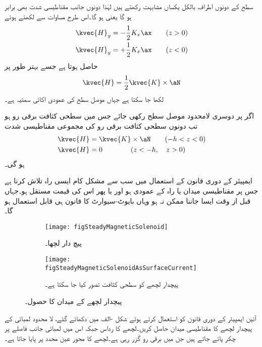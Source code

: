 سطح کے دونوں اطراف بالکل یکساں مشابہت رکھتے ہیں لہٰذا دونوں جانب  مقناطیسی شدت بھی برابر ہو گا یعنی  ہو گا۔اس طرح مساوات  سے  لکھتے ہوئے
\begin{align*}
\kvec{H}_{y}&=-\frac{1}{2}K_x \ax \quad \quad (z>0)\\
\kvec{H}_{y}&=+\frac{1}{2}K_x \ax \quad \quad (z<0)
\end{align*}
حاصل ہوتا ہے جسے  بہتر طور پر 
\begin{align}
\kvec{H}=\frac{1}{2} \kvec{K} \times \aN
\end{align}
لکھا جا سکتا ہے جہاں  موصل سطح کی عمودی اکائی سمتیہ ہے۔

اگر  پر دوسری لامحدود موصل سطح رکھی جائے جس میں سطحی کثافت برقی رو  ہو تب دونوں سطحی کثافت برقی رو کی مجموعی مقناطیسی شدت
\begin{gather}
\begin{aligned}
\kvec{H}&=\kvec{K} \times \aN \quad \quad (-h <z < 0)\\
\kvec{H}&=0 \quad \quad \quad \quad  (z<-h, \quad z>0) 
\end{aligned}
\end{gather}
ہو گی۔

ایمپیئر کے دوری قانون کے استعمال میں سب سے مشکل کام ایسی راہ تلاش کرنا ہے جس پر مقناطیسی میدان یا راہ کے عمودی ہو اور یا پھر اس کی قیمت مستقل ہو۔جہاں قبل از وقت ایسا جاننا ممکن نہ ہو وہاں بایوٹ-سیوارٹ کا قانون ہی قابل استعمال ہو گا۔ 

\begin{figure}
\centering
\begin{subfigure}{0.4\textwidth}
\centering
\texttt{[image: figSteadyMagneticSolenoid]}
\caption{پیچ دار لچھا۔}
\end{subfigure}%
%
\begin{subfigure}{0.4\textwidth}
\centering
\texttt{[image: figSteadyMagneticSolenoidAsSurfaceCurrent]}
\caption{پیچدار لچھے کو سطحی کثافت تصور کیا جا سکتا ہے۔}
\end{subfigure}%
\caption{پیچدار لچھے کے میدان کا حصول۔}
\label{شکل-مقناطیسی_پیچدار_لچھا}
\end{figure}

آئیں ایمپیئر کے دوری قانون کو استعمال کرتے ہوئے شکل -الف میں دکھائے گئے، لا محدود لمبائی کے پیچدار لچھے  کا مقناطیسی میدان حاصل کریں۔لچھے کا رداس  جبکہ اس میں لمبائی جانب   فاصلے پر  چکر پائے جاتے ہیں جن میں برقی رو  گزر رہی ہے۔لچھے کا محور عین  محدد پر پایا جاتا ہے۔  

